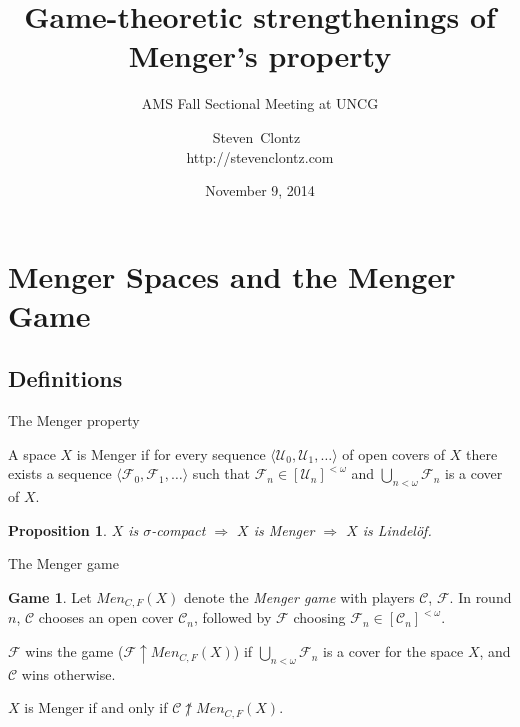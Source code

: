 \documentclass{beamer}
\title
{Game-theoretic strengthenings of Menger's property}
\subtitle
{AMS Fall Sectional Meeting at UNCG} %
\author%
{Steven~Clontz~\\http://stevenclontz.com}%
\institute[Auburn University] %
{
  Department of Mathematics and Statistics\\
  Auburn University}
\date[14-11-09] %
{November 9, 2014}
\newtheorem{proposition}[theorem]{Proposition}
\theoremstyle{definition}
\newtheorem{game}[theorem]{Game}
\newcommand{\win}{\uparrow}
\newcommand{\mengame}[1]{Men_{C,F}(#1)}
\newcommand{\<}{\langle}
\renewcommand{\>}{\rangle}
\newcommand{\mc}[1]{\mathcal{#1}}
\newcommand{\pl}[1]{\mathscr{#1}}
\newcommand{\term}{\textit}
\begin{document}
\newcommand{\vpause}{\pause\vspace{1em}}

\begin{frame}
  \titlepage
\end{frame}

\section{Menger Spaces and the Menger Game}

\subsection{Definitions}

\begin{frame}{The Menger property}
  \begin{definition}
    A space $X$ is Menger if for every sequence $\<\mc U_0,\mc U_1,\dots\>$
    of open covers of $X$ there exists a sequence
    $\<\mc F_0,\mc F_1,\dots\>$ such that $\mc F_n\in [\mc U_n]^{<\omega}$
    and $\bigcup_{n<\omega}\mc F_n$ is a cover of $X$.
  \end{definition}

  \pause

  \begin{proposition}
    $X$ is $\sigma$-compact
      $\Rightarrow$
    $X$ is Menger
      $\Rightarrow$
    $X$ is Lindel\"of.
  \end{proposition}
\end{frame}

\begin{frame}{The Menger game}
  \begin{game}
    Let $\mengame{X}$ denote the \term{Menger game} with players
    $\pl C$, $\pl F$.
    In round $n$, $\pl C$ chooses an open cover $\mc C_n$,
    followed by $\pl F$ choosing $\mc F_n\in[\mc C_n]^{<\omega}$.

    $\pl F$ wins the game ($\pl F \win \mengame{X}$) if
    $\bigcup_{n<\omega}\mc F_n$ is a cover for the space
    $X$, and $\pl C$ wins otherwise.
  \end{game}

  \pause

  \begin{theorem}
    $X$ is Menger if and only if $\pl C \not\win \mengame X$.
  \end{theorem}
\end{frame}
\end{document}
